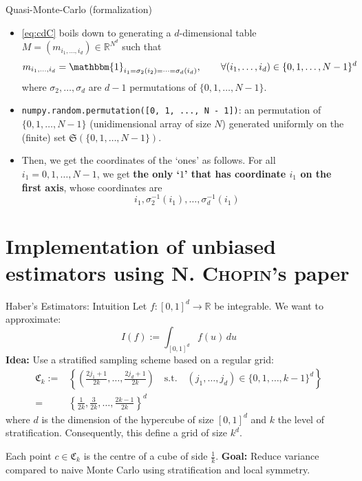 \documentclass[aspectratio=169,xcolor=dvipsnames]{beamer}
\newcommand{\bdOne}{\mathbbm{1}}
\begin{document}
    \begin{frame}{Quasi-Monte-Carlo (formalization)}
        \begin{itemize}
            \item<1-> \eqref{eq:cdC} boils down to generating a $d$-dimensional table $M = (m_{i_1, \dots, i_d}) \in \mathbb{R}^{N^d}$ such that
            \[m_{i_1, \dots, i_d} = \bdOne_{i_1 = \sigma_2(i_2) = \cdots = \sigma_d(i_d)}, \qquad \forall (i_1, \dots, i_d) \in \{0, 1, \dots, N - 1\}^d\]
            where $\sigma_2, \dots, \sigma_d$ are $d - 1$ permutations of $\{0, 1, \dots, N - 1\}$.

            \item<2-> \texttt{numpy.random.permutation([0, 1, ..., N - 1])}: an permutation of $\{0, 1, \dots, N - 1\}$ (unidimensional array of size $N$) generated uniformly on the (finite) set $\mathfrak{S}(\{0, 1, \dots, N - 1\})$.

            \item<3-> Then, we get the coordinates of the `ones' as follows. For all $i_1 = 0, 1, \dots, N - 1$, we get \textbf{the only `$1$' that has coordinate $i_1$ on the first axis}, whose coordinates are
            \[i_1, \sigma_2^{-1}(i_1), \dots, \sigma_d^{-1}(i_1)\]
        \end{itemize}
    \end{frame}

    \section{Implementation of unbiased estimators using N. \textsc{Chopin}'s paper}

    \begin{frame}{Haber's Estimators: Intuition}
        Let \( f : [0,1]^d \to \mathbb{R} \) be integrable. We want to approximate:
        \[
        I(f) := \int_{[0,1]^d} f(u) \, du
        \]
        \textbf{Idea:} Use a stratified sampling scheme based on a regular grid:
        $$\begin{aligned} \mathfrak{C}_k := &\left\{\left(\frac{2j_1 + 1}{2k}, \dots, \frac{2j_d + 1}{2k}\right) \quad \text{s.t.} \quad (j_1, \dots, j_d) \in \{0, 1, \dots, k - 1\}^d\right\} \\ = &\left\{\frac{1}{2k}, \frac{3}{2k}, \dots, \frac{2k - 1}{2k}\right\}^d \end{aligned}$$
        where $d$ is the dimension of the hypercube of size $[0,1]^d$ and $k$ the level of stratification. Consequently, this define a grid of size $k^d$.  
        \vspace{1em}

        Each point \( c \in \mathfrak{C}_k \) is the centre of a cube of side \( \frac{1}{k} \).  
        \vspace{1em}
        \vspace{0.5em}
        \textbf{Goal:} Reduce variance compared to naive Monte Carlo using stratification and local symmetry.
    
            
    \end{frame}
\end{document}
